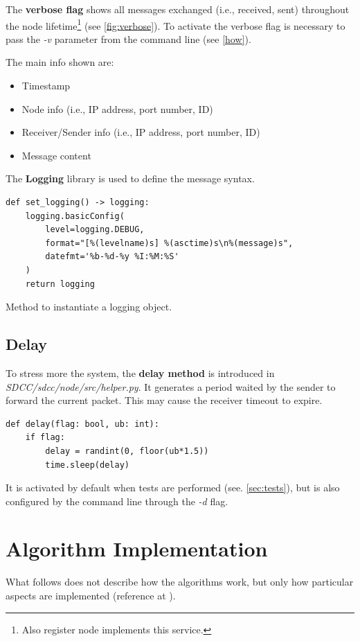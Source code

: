 \documentclass[conference]{IEEEtran}
\begin{document}
The \textbf{verbose flag} shows all messages exchanged (i.e., received, sent) throughout the node lifetime\footnote{Also register node implements this service.} (see \ref{fig:verbose}). 
To activate the verbose flag is necessary to pass the \textit{-v} parameter from the command line (see \ref{how}). 

The main info shown are:
\begin{itemize}
    \item Timestamp
    \item Node info (i.e., IP address, port number, ID)
    \item Receiver/Sender info (i.e., IP address, port number, ID)
    \item Message content
\end{itemize}

The \textbf{Logging} library is used to define the message syntax.

\begin{lstlisting}
def set_logging() -> logging:
    logging.basicConfig(
        level=logging.DEBUG,
        format="[%(levelname)s] %(asctime)s\n%(message)s",
        datefmt='%b-%d-%y %I:%M:%S'
    )
    return logging
\end{lstlisting}\caption{Method to instantiate a logging object.}

\subsection{Delay}\label{delay}

To stress more the system, the \textbf{delay method} is introduced in \textit{SDCC/sdcc/node/src/helper.py}. It generates a period waited by the sender to forward the current packet. This may cause the receiver timeout to expire.
\begin{lstlisting}
def delay(flag: bool, ub: int):
    if flag:
        delay = randint(0, floor(ub*1.5))
        time.sleep(delay)
\end{lstlisting}
It is activated by default when tests are performed (see. \ref{sec:tests}), but is also configured by the command line through the \textit{-d} flag.

\section{Algorithm Implementation}

What follows does not describe how the algorithms work, but only how particular aspects are implemented (reference at \cite{coulouris2005distributed}).
\end{document}

